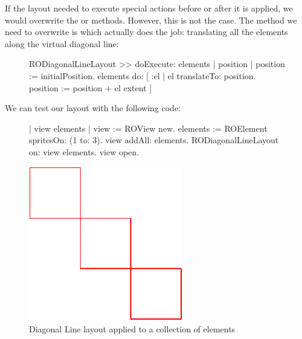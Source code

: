 \documentclass[a4paper,10pt,twoside]{book}
\begin{document}
If the layout needed to execute special actions before or after it is applied, we would overwrite the  or  methods. However, this is not the case. 
The method we need to overwrite is  which actually does the job: translating all the elements along the virtual diagonal line:

\begin{figure}[H]
\begin{code}{}
RODiagonalLineLayout >> doExecute: elements
	| position |	
	position := initialPosition.
	elements do: [ :el | 
		el translateTo: position.
		position := position + el extent ] 
\end{code}
\end{figure}

We can test our layout with the following code:

\begin{figure}[H]
      \begin{minipage}[t]{0.61\textwidth}
      \vspace{0pt}
\begin{code}{}
| view elements |
view := ROView new.
elements := ROElement spritesOn: (1 to: 3).
view addAll: elements.
RODiagonalLineLayout on: view elements.
view open.
\end{code}
   \end{minipage}
   \hfill
   \begin{minipage}[t]{0.5\textwidth}
      \vspace{0pt}\raggedright
       \centering
		\includegraphics[width=0.6\textwidth]{diagonalLineLayout}
   \end{minipage}
\label{fig:diagonalLineLayout}
\caption{Diagonal Line layout applied to a collection of elements}
\end{figure} 
\end{document}
